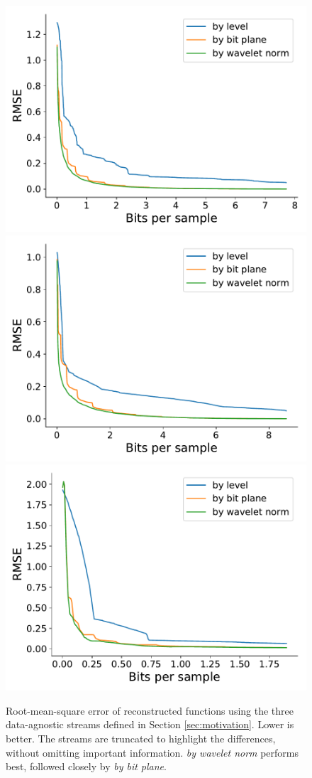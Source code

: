 \begin{figure}
 	{\includegraphics[width=0.48\linewidth]{img/motivation/motivation-psnr-turbulence.pdf}}
 	{\includegraphics[width=0.48\linewidth]{img/motivation/motivation-psnr-plasma.pdf}}
 	{\includegraphics[width=0.48\linewidth]{img/motivation/motivation-psnr-velocityz.pdf}}
 	\caption{Root-mean-square error of reconstructed functions using the three data-agnostic streams
 	defined in Section \ref{sec:motivation}. Lower is better. The streams are truncated to highlight
 	the differences, without omitting important information. \emph{by wavelet norm} performs best,
 	followed closely by \emph{by bit plane}.}
 	\label{fig:motivation-rmse}
\end{figure}

